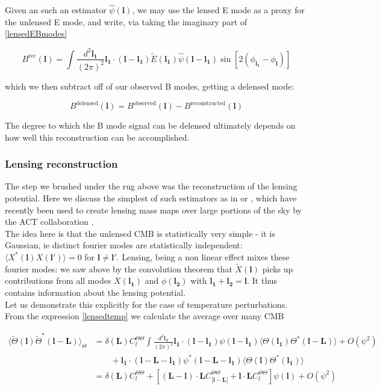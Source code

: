 \documentclass[a4paper,10pt]{article}
\renewcommand{\v}[1]{\mathbf{#1}}
\newcommand{\finttwo}[1]{\int \frac{d^2 \v{#1}}{(2\pi)^2}}
\begin{document}
Given an such an estimator $\hat{\psi}(\v{l})$, we may use the lensed E mode as a proxy for the unlensed E mode, and write, via taking the imaginary part of \ref{lensedEBmodes}

\begin{equation}
B^{\text{rec}}(\v{l}) = \finttwo{l_1} \v{l_1}\cdot(\v{l}-\v{l_1}) \tilde{E}(\v{l_1})\hat{\psi}(\v{l}-\v{l_1})\sin[2(\phi_\v{l_1}-\phi_\v{l})]
\label{sin}
\end{equation} 

which we then subtract off of our observed B modes, getting a delensed mode:

\begin{equation}
B^{\text{delensed}}(\v{l}) = B^{\text{observed}}(\v{l}) - B^{\text{reconstructed}}(\v{l})
\end{equation}

The degree to which the B mode signal can be delensed ultimately depends on how well this reconstruction can be accomplished. 

\subsubsection{Lensing reconstruction}

The step we brushed under the rug above was the reconstruction of the lensing potential. Here we discuss the simplest of such estimators as in \cite{hu-estimator} or \cite{lewis}, which have recently been used to create lensing mass maps over large portions of the sky by the ACT collaboration \cite{darwish}. \\

The idea here is that the unlensed CMB is statistically very simple - it is Gaussian, ie distinct fourier modes are statistically independent: $\langle X^*(\v{l})X(\v{l'})\rangle =0$ for  $\v{l} \neq \v{l'}$. Lensing, being a non linear effect mixes these fourier modes: we saw above by the convolution theorem that  $\tilde{X}(\v{l})$ picks up contributions from all modes ${X}(\v{l_1})$ and $\phi(\v{l_2})$ with $\v{l_1}+\v{l_2}=\v{l}$. It thus contains information about the lensing potential.\\

Let us demonstrate this explicitly for the case of temperature perturbations. From the expression \ref{lensedtemp} we calculate the average over many CMB

\begin{equation}\begin{split}
\langle \tilde{\Theta}(\v{l})\tilde{\Theta}^*(\v{l}-\v{L})\rangle_{\Theta} &= \delta(\v{L})C_l^{\Theta\Theta} \finttwo{l_1}  \v{l_1}\cdot(\v{l}-\v{l_1})\psi(\v{l}-\v{l_1}) \langle \Theta(\v{l_1})\Theta^*(\v{l}-\v{L})\rangle + O(\psi^2) \\
&\qquad + \v{l_1}\cdot(\v{l}-\v{L}-\v{l_1})\psi^*(\v{l}-\v{L}-\v{l_1}) \langle \Theta(\v{l})\Theta^*(\v{l_1})\rangle\\
&=\delta(\v{L})C_l^{\Theta\Theta} + [(\v{L}-\v{l})\cdot\v{L}C^{\Theta\Theta}_{|\v{l}-\v{L}|}+\v{l}\cdot\v{L}C_l^{\Theta\Theta}]\psi(\v{l}) + O(\psi^2)
\end{split}\end{equation}
\end{document}
